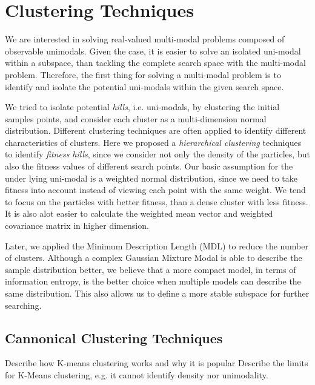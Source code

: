 \chapter{Clustering Techniques}
\label{chapter:clustering}

We are interested in solving real-valued multi-modal problems composed of observable unimodals.
Given the case, it is easier to solve an isolated uni-modal within a subspace,
than tackling the complete search space with the multi-modal problem.
Therefore, the first thing for solving a multi-modal problem is to identify and isolate 
the potential uni-modals within the given search space.

We tried to isolate potential \textit{hills}, i.e. uni-modals,
by clustering the initial samples points,
and consider each cluster as a multi-dimension normal distribution.
Different clustering techniques are often applied to identify different characteristics of clusters.
Here we proposed a \textit{hierarchical clustering} techniques to identify \textit{fitness hills},
since we consider not only the density of the particles,
but also the fitness values of different search points.
Our basic assumption for the under lying uni-modal is a weighted normal distribution, 
since we need to take fitness into account instead of viewing each point with the same weight.
We tend to focus on the particles with better fitness,
than a dense cluster with less fitness. 
It is also alot easier to calculate the weighted mean vector and weighted covariance matrix in higher dimension. 

Later, we applied the Minimum Description Length (MDL) to reduce the number of clusters.
Although a complex Gaussian Mixture Modal is able to describe the sample distribution better,
we believe that a more compact model, in terms of information entropy, is the better choice 
when multiple models can describe the same distribution. 
This also allows us to define a more stable subspace for further searching.


\section{Cannonical Clustering Techniques}
Describe how K-means clustering works and why it is popular
Describe the limits for K-Means clustering, e.g. it cannot identify density nor unimodality. 


